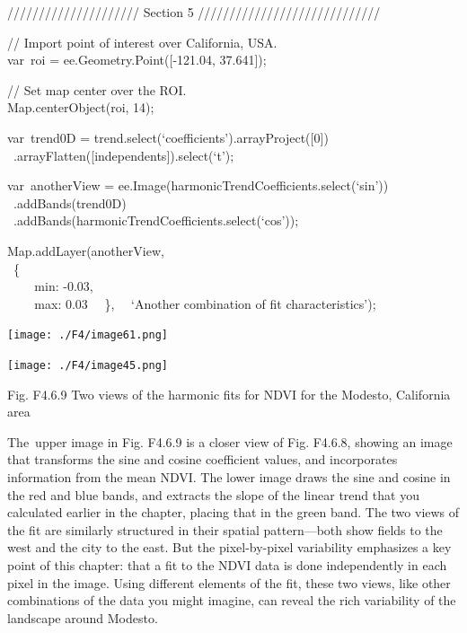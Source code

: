 \documentclass[
  letterpaper,
  DIV=11,
  numbers=noendperiod]{scrreprt}
\begin{document}
///////////////////// Section 5 /////////////////////////////

// Import point of interest over California, USA.\\
var~roi = ee.Geometry.Point({[}-121.04, 37.641{]});

// Set map center over the ROI.\\
Map.centerObject(roi, 14);

var~trend0D = trend.select(`coefficients').arrayProject({[}0{]})\\
\hspace*{0.333em} ~.arrayFlatten({[}independents{]}).select(`t');

var~anotherView = ee.Image(harmonicTrendCoefficients.select(`sin'))\\
\hspace*{0.333em} ~.addBands(trend0D)\\
\hspace*{0.333em} ~.addBands(harmonicTrendCoefficients.select(`cos'));

Map.addLayer(anotherView,\\
\hspace*{0.333em} ~\{\\
\hspace*{0.333em} ~ ~ ~min: -0.03,\\
\hspace*{0.333em} ~ ~ ~max: 0.03~ ~\},~ ~`Another combination of fit
characteristics');

\texttt{[image: ./F4/image61.png]}

\texttt{[image: ./F4/image45.png]}

Fig. F4.6.9 Two views of the harmonic fits for NDVI for the Modesto,
California area

The~upper image in Fig. F4.6.9 is a closer view of Fig. F4.6.8, showing
an image that transforms the sine and cosine coefficient values, and
incorporates information from the mean NDVI. The lower image draws the
sine and cosine in the red and blue bands, and extracts the slope of the
linear trend that you calculated earlier in the chapter, placing that in
the green band. The two views of the fit are similarly structured in
their spatial pattern---both show fields to the west and the city to the
east. But the pixel-by-pixel variability emphasizes a key point of this
chapter: that a fit to the NDVI data is done independently in each pixel
in the image. Using different elements of the fit, these two views, like
other combinations of the data you might imagine, can reveal the rich
variability of the landscape around Modesto.
\end{document}
